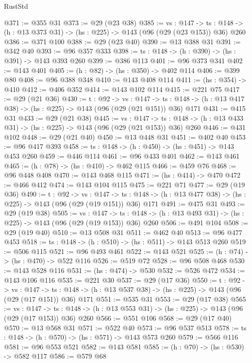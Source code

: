 \begin{lexlean}{RustStd}
\begin{coremodule}
@371 := @355 @31
@373 := @29 (@23 @38)
@385 := {vs : @147} ->
  {ts : @148} -> (h : @13 @373 @31) -> (hs : @225) -> @143 (@96 (@29 (@23 @153)) @36) @260
@386 := @371 @100
@388 := @29 (@23 @40)
@390 := @13 @388 @31
@391 := @342 @40
@393 := @96 @357 @333
@398 := {ts : @148} -> (h : @390) -> (hs : @391) -> @143 @393 @260
@399 := @386 @113
@401 := @96 @373 @341
@402 := @143 @401
@405 := (h : @82) -> (hs : @350) -> @402 @114
@406 := @399 @80
@408 := @96 @388 @348
@410 := @143 @408 @114
@411 := (hs : @354) -> @410
@412 := @406 @352
@414 := @143 @102 @114
@415 := @221 @75
@417 := @29 (@21 @36)
@430 := {t : @92} ->
  {vs : @147} ->
  {ts : @148} -> (h : @13 @417 @38) -> (hs : @225) -> @143 (@96 (@29 (@21 @151)) @36) @171
@431 := @415 @31
@433 := @29 (@21 @38)
@445 := {vs : @147} ->
  {ts : @148} -> (h : @13 @433 @31) -> (hs : @225) -> @143 (@96 (@29 (@21 @153)) @36) @260
@446 := @431 @102
@448 := @29 (@21 @40)
@450 := @13 @448 @31
@451 := @402 @40
@453 := @96 @417 @393
@458 := {ts : @148} -> (h : @450) -> (hs : @451) -> @143 @453 @260
@459 := @446 @114
@461 := @96 @433 @401
@462 := @143 @461
@465 := (h : @78) -> (hs : @410) -> @462 @115
@466 := @459 @76
@468 := @96 @448 @408
@470 := @143 @468 @115
@471 := (hs : @414) -> @470
@472 := @466 @412
@474 := @143 @104 @115
@475 := @221 @71
@477 := @29 (@19 @36)
@490 := {t : @92} ->
  {vs : @147} ->
  {ts : @148} -> (h : @13 @477 @38) -> (hs : @225) -> @143 (@96 (@29 (@19 @151)) @36) @171
@491 := @475 @31
@493 := @29 (@19 @38)
@505 := {vs : @147} ->
  {ts : @148} -> (h : @13 @493 @31) -> (hs : @225) -> @143 (@96 (@29 (@19 @153)) @36) @260
@506 := @491 @104
@508 := @29 (@19 @40)
@510 := @13 @508 @31
@511 := @462 @40
@513 := @96 @477 @453
@518 := {ts : @148} -> (h : @510) -> (hs : @511) -> @143 @513 @260
@519 := @506 @115
@521 := @96 @493 @461
@522 := @143 @521
@525 := (h : @74) -> (hs : @470) -> @522 @116
@526 := @519 @72
@528 := @96 @508 @468
@530 := @143 @528 @116
@531 := (hs : @474) -> @530
@532 := @526 @472
@534 := @143 @106 @116
@535 := @221 @30
@537 := @29 (@17 @36)
@550 := {t : @92} ->
  {vs : @147} ->
  {ts : @148} -> (h : @13 @537 @38) -> (hs : @225) -> @143 (@96 (@29 (@17 @151)) @36) @171
@551 := @535 @31
@553 := @29 (@17 @38)
@565 := {vs : @147} ->
  {ts : @148} -> (h : @13 @553 @31) -> (hs : @225) -> @143 (@96 (@29 (@17 @153)) @36) @260
@566 := @551 @106
@568 := @29 (@17 @40)
@570 := @13 @568 @31
@571 := @522 @40
@573 := @96 @537 @513
@578 := {ts : @148} -> (h : @570) -> (hs : @571) -> @143 @573 @260
@579 := @566 @116
@581 := @96 @553 @521
@582 := @143 @581
@585 := (h : @70) -> (hs : @530) -> @582 @117
@586 := @579 @68

\end{coremodule}
\end{lexlean}
